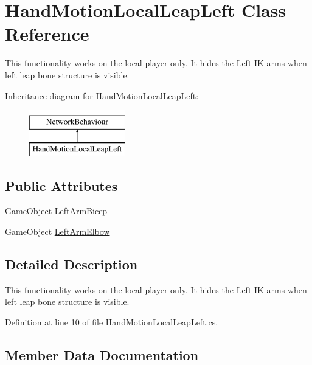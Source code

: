 \hypertarget{class_hand_motion_local_leap_left}{}\section{Hand\+Motion\+Local\+Leap\+Left Class Reference}
\label{class_hand_motion_local_leap_left}


This functionality works on the local player only. It hides the Left IK arms when left leap bone structure is visible.  


Inheritance diagram for Hand\+Motion\+Local\+Leap\+Left\+:\begin{figure}[H]
\begin{center}
\leavevmode
\includegraphics[height=2.000000cm]{class_hand_motion_local_leap_left}
\end{center}
\end{figure}
\subsection*{Public Attributes}
\begin{DoxyCompactItemize}
\item 
Game\+Object \mbox{\hyperlink{class_hand_motion_local_leap_left_a0c6a46fab3fac24febccf2c0b2f58d7e}{Left\+Arm\+Bicep}}
\item 
Game\+Object \mbox{\hyperlink{class_hand_motion_local_leap_left_a61131895af083c1d9c38f9fb5abf5316}{Left\+Arm\+Elbow}}
\end{DoxyCompactItemize}


\subsection{Detailed Description}
This functionality works on the local player only. It hides the Left IK arms when left leap bone structure is visible. 



Definition at line 10 of file Hand\+Motion\+Local\+Leap\+Left.\+cs.



\subsection{Member Data Documentation}
\mbox{\label{class_hand_motion_local_leap_left_a0c6a46fab3fac24febccf2c0b2f58d7e}} 

